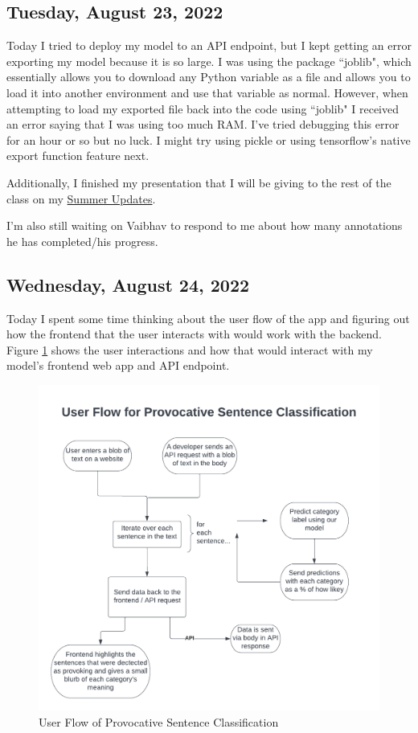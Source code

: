 \documentclass[11pt,letterpaper]{article}
\begin{document}
\subsection{Tuesday, August 23, 2022}
Today I tried to deploy my model to an API endpoint, but I kept getting an error exporting my model because it is so large. I was using the package ``joblib", which essentially allows you to download any Python variable as a file and allows you to load it into another environment and use that variable as normal. However, when attempting to load my exported file back into the code using ``joblib" I received an error saying that I was using too much RAM. I've tried debugging this error for an hour or so but no luck. I might try using pickle or using tensorflow's native export function feature next.

Additionally, I finished my presentation that I will be giving to the rest of the class on my \href{https://drive.google.com/file/d/1DS6dqwKjhULGXQlOEomzv4M6ShNxKnqK/view?usp=sharing}{Summer Updates}.

I'm also still waiting on Vaibhav to respond to me about how many annotations he has completed/his progress.

\subsection{Wednesday, August 24, 2022}
Today I spent some time thinking about the user flow of the app and figuring out how the frontend that the user interacts with would work with the backend. Figure \ref{fig:userflow_df} shows the user interactions and how that would interact with my model's frontend web app and API endpoint.

\begin{figure}
    \centering
    \includegraphics[scale=0.4]{images/userflow_d1.png}
    \caption{User Flow of Provocative Sentence Classification}
    \label{fig:userflow_df}
\end{figure}
\end{document}
